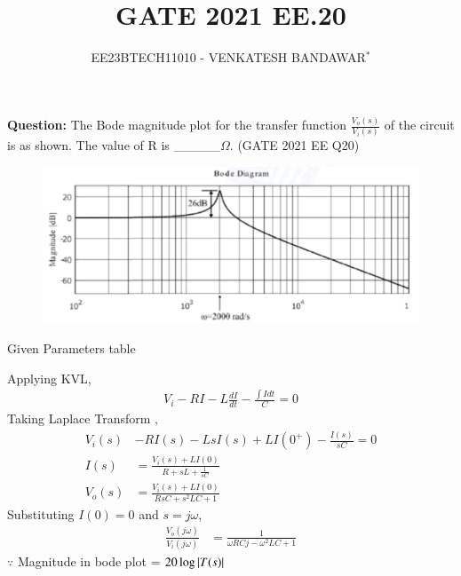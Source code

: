 \documentclass[journal,12pt,twocolumn]{IEEEtran}
\theoremstyle{remark}
\begin{document}

\vspace{3cm}

\title{GATE 2021 EE.20}
\author{EE23BTECH11010 - VENKATESH BANDAWAR$^{*}$%
}
\maketitle
\newpage
\bigskip
\textbf{Question:} The Bode magnitude plot for the transfer function $\frac{V_o(s)}{V_i(s)}$ of the circuit is as shown. The value of R is \_\_\_\_\_$\Omega$. \hfill(GATE 2021 EE Q20)
\begin{figure}[!ht]
    \centering
    
\end{figure}
\begin{figure}[!ht]
    \centering
    \includegraphics[width=\columnwidth]{figs/bode.png}
\end{figure}
\solution
\begin{table}[!ht]
    \centering
    
    \caption{Given Parameters table}
    \label{Given Parameters table_2021_EE_20}
\end{table}
Applying KVL,
\begin{align}
    V_i - R I - L\frac{dI}{dt} - \frac{\int I dt}{C} = 0
\end{align}
Taking Laplace Transform ,
\begin{align}
    V_i(s) &- RI(s) - LsI(s) + LI(0^+) - \frac{I(s)}{sC} = 0\\
    I(s) &= \frac{V_i(s) + LI(0)}{R + sL + \frac{1}{sC}}\\
    V_o(s) &= \frac{V_i(s) + LI(0)}{RsC + s^2LC + 1}
\end{align}
Substituting $I(0) = 0$ and $s = j\omega$,
\begin{align}
    \frac{V_o(j\omega)}{V_i(j\omega)} &= \frac{1}{\omega RCj -\omega^2LC + 1} 
\end{align}
$\because$ Magnitude in bode plot = $20\log \left\vert T(s)\right\vert$\\
\end{document}
